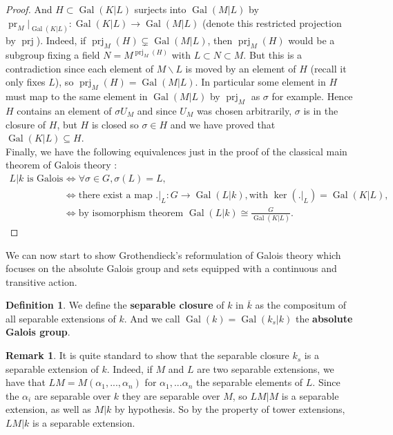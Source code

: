 \documentclass{article}
\theoremstyle{plain}
\theoremstyle{definition}
\newtheorem{definition}[theorem]{Definition}
\newtheorem{remark}{Remark}
\DeclareMathOperator{\Gal}{Gal}
\DeclareMathOperator{\pr}{pr}
\DeclareMathOperator{\prj}{prj}
\begin{document}
\begin{proof}
    And $H\subset \Gal(K|L)$ surjects into $\Gal(M|L)$ by $\pr_M\vert_{\Gal(K|L)}:\Gal(K|L)\rightarrow \Gal(M|L)$ (denote this restricted projection by $\prj$).
    Indeed, if $\prj_M(H)\subsetneq \Gal(M|L)$, then $\prj_M(H)$ would be a subgroup fixing a field $N = M^{\prj_M(H)}$ with $L\subset N\subset M$. But this is a contradiction since each element of $M\backslash L$ is moved by an element of $H$ (recall it only fixes $L$), so $\prj_M(H) = \Gal(M|L)$.
    In particular some element in $H$ must map to the same element in $\Gal(M|L)$ by $\prj_M$ as $\sigma$ for example.
    Hence $H$ contains an element of $\sigma U_M$ and since $U_M$ was chosen arbitrarily, $\sigma$ is in the closure of $H$, but $H$ is closed so $\sigma \in H$ and we have proved that $\Gal(K|L) \subseteq H$.\\
    Finally, we have the following equivalences just in the proof of the classical main theorem of Galois theory :
    \begin{equation*}
    \begin{split}
        \text{$L|k$ is Galois} &\Leftrightarrow  \forall\sigma\in G, \sigma(L) = L,\\
        &\Leftrightarrow \text{there exist a map } .\vert_L:G\rightarrow\Gal(L|k), \text{with $\ker(.\vert_L) = \Gal(K|L)$},\\
        &\Leftrightarrow  \text{by isomorphism theorem } \Gal(L|k) \cong \frac{G}{\Gal(K|L)}.
    \end{split}
    \end{equation*}
\end{proof}

\noindent We can now start to show Grothendieck's reformulation of Galois theory which focuses on the absolute Galois group and sets equipped with a continuous and transitive action.

\begin{definition}
\label{separable_closure}
    We define the \textbf{separable closure} of $k$ in $\overline{k}$ as the compositum of all separable extensions of $k$. And we call $\Gal(k)=\Gal(k_s|k)$ the \textbf{absolute Galois group}.
\end{definition}

\begin{remark}
    It is quite standard to show that the separable closure $k_s$ is a separable extension of $k$.
    Indeed, if $M$ and $L$ are two separable extensions, we have that $LM = M(\alpha_1,...,\alpha_n)$ for $\alpha_1,...\alpha_n$ the separable elements of $L$. Since the $\alpha_i$ are separable over $k$ they are separable over $M$, so $LM|M$ is a separable extension, as well as $M|k$ by hypothesis. So by the property of tower extensions, $LM|k$ is a separable extension.
\end{remark}
\end{document}

